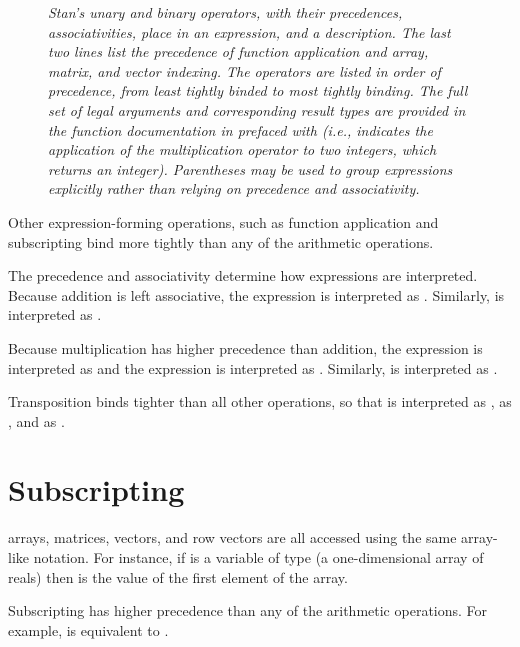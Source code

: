 \begin{figure}
\begin{center}
\end{center}
\caption{\it Stan's unary and binary operators, with their
  precedences, associativities, place in an expression, and a
  description.  The last two lines list the precedence of function
  application and array, matrix, and vector indexing. The operators are
  listed in order of precedence, from least tightly binded to most
  tightly binding.  The full set of legal arguments and corresponding
  result types are provided in the function documentation in
   prefaced with  (i.e.,
   indicates the application of the
  multiplication operator to two integers, which returns an integer).
  Parentheses may be used to group expressions explicitly rather than
  relying on precedence and
  associativity.}\label{operator-precedence.figure}
\end{figure}
%
Other expression-forming operations, such as function application and
subscripting bind more tightly than any of the arithmetic operations.  

The precedence and associativity determine how expressions are
interpreted.  Because addition is left associative, the expression
 is interpreted as .  Similarly,
 is interpreted as .  

Because multiplication has higher precedence than addition, the
expression  is interpreted as  and the
expression  is interpreted as .  Similarly,
 is interpreted as .

Transposition binds tighter than all other operations, so that
 is interpreted as ,  as
, and  as .

\section{Subscripting}

\Stan arrays, matrices, vectors, and row vectors are all accessed
using the same array-like notation.  For instance, if  is a
variable of type  (a one-dimensional array of reals)
then  is the value of the first element of the
array.  

Subscripting has higher precedence than any of the arithmetic
operations.  For example,  is equivalent to
.  

